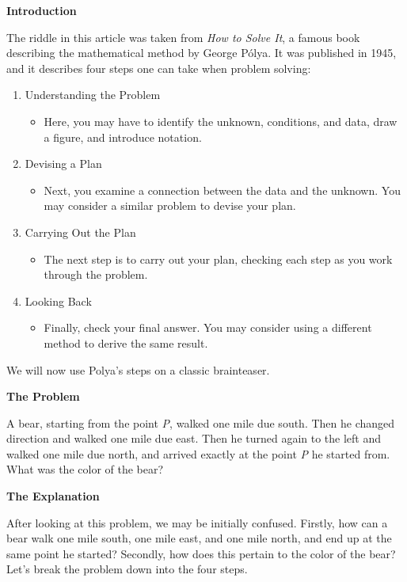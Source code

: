 
\noindent
\textbf{Introduction}

The riddle in this article was taken from \emph{How to Solve It}, a famous book describing the mathematical method by George Pólya. It was published in 1945, and it describes four steps one can take when problem solving:

\begin{enumerate}
   \item Understanding the Problem
   \begin{itemize}
     \item Here, you may have to identify the unknown, conditions, and data, draw a figure, and introduce notation.
   \end{itemize}
   \item Devising a Plan
   \begin{itemize}
     \item Next, you examine a connection between the data and the unknown. You may consider a similar problem to devise your plan.
   \end{itemize}
   \item Carrying Out the Plan
   \begin{itemize}
     \item The next step is to carry out your plan, checking each step as you work through the problem.
   \end{itemize}
   \item Looking Back
   \begin{itemize}
     \item Finally, check your final answer. You may consider using a different method to derive the same result.
   \end{itemize}
\end{enumerate}

\noindent
We will now use Polya’s steps on a classic brainteaser.

\noindent
\textbf{The Problem}

A bear, starting from the point \emph{P}, walked one mile due south. Then he changed direction and walked one mile due east. Then he turned again to the left and walked one mile due north, and arrived exactly at the point \emph{P} he started from. What was the color of the bear?

\noindent
\textbf{The Explanation}

After looking at this problem, we may be initially confused. Firstly, how can a bear walk one mile south, one mile east, and one mile north, and end up at the same point he started? Secondly, how does this pertain to the color of the bear? Let’s break the problem down into the four steps.

